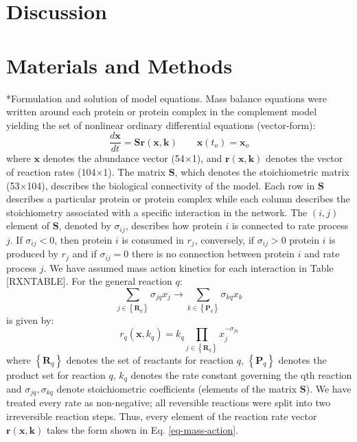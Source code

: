 \documentclass[12pt]{article}
\makeatletter
\renewcommand\subsection{\@startsection
	{subsection}{2}{0mm}
	{-0.05in}
	{-0.5\baselineskip}
	{\normalfont\normalsize\bfseries}}
\makeatother
\begin{document}
\section*{Discussion}

\clearpage

\section*{Materials and Methods}
\subsection*{Formulation and solution of model equations.}
Mass balance equations were written around each protein or protein complex in the complement model yielding the set of nonlinear ordinary differential equations (vector-form):
\begin{equation}\label{eq-compact-form}
\frac{d\mathbf{x}}{dt}=\mathbf{S}\mathbf{r}\left(\mathbf{x},\mathbf{k}\right)\qquad\mathbf{x}\left(t_{o}\right)=\mathbf{x}_{o}
\end{equation}where $\mathbf{x}$ denotes the abundance vector (54$\times$1),
and $\mathbf{r}\left(\mathbf{x},\mathbf{k}\right)$ denotes the vector of reaction rates (104$\times$1).
The matrix $\mathbf{S}$, which denotes the stoichiometric matrix (53$\times$104), describes the biological connectivity of the model. 
Each row in $\mathbf{S}$ describes a particular protein or protein complex while each column describes the stoichiometry associated with a specific interaction in the network. 
The $(i,j)$ element of $\mathbf{S}$, denoted by $\sigma_{ij}$, describes how protein $i$ is connected to rate process $j$. 
If $\sigma_{ij}<0$, then protein $i$ is consumed in $r_{j}$, conversely, if $\sigma_{ij}>0$ protein $i$ is produced by $r_{j}$ and if $\sigma_{ij}=0$ 
there is no connection between protein $i$ and rate process $j$.
We have assumed mass action kinetics for each interaction in Table [RXNTABLE]. 
For the general reaction $q$:
\begin{equation}
\sum_{j\in\left\{\mathbf{R}_{q}\right\}}\sigma_{jq}x_{j}\rightarrow\sum_{k\in\left\{\mathbf{P}_{q}\right\}}\sigma_{kq}x_{k}
\end{equation}is given by:
\begin{equation}\label{eq-mass-action}
r_{q}\left(\mathbf{x},k_{q}\right)=k_{q}\prod_{j\in\left\{\mathbf{R}_{q}\right\}}x_{j}^{-\sigma_{jq}}
\end{equation}where $\left\{\mathbf{R}_{q}\right\}$ denotes the set of reactants for reaction $q$, $\left\{\mathbf{P}_{q}\right\}$
denotes the product set for reaction $q$, $k_{q}$ denotes the rate constant governing the qth reaction 
and $\sigma_{jq},\sigma_{kq}$ denote stoichiometric coefficients (elements of the matrix $\mathbf{S}$). 
We have treated every rate as non-negative; all reversible reactions were split into two irreversible reaction steps. 
Thus, every element of the reaction rate vector $\mathbf{r}\left(\mathbf{x},\mathbf{k}\right)$ takes the form shown in Eq. \eqref{eq-mass-action}.
\end{document}
